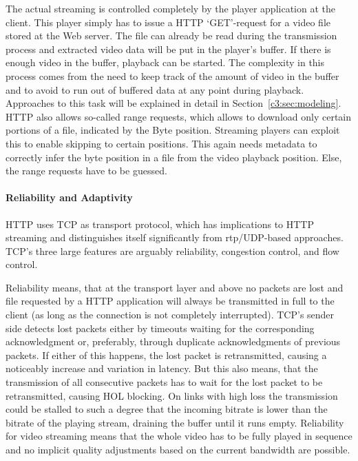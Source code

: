 The actual streaming is controlled completely by the player application at the client. This player simply has to issue a \gls{HTTP} `GET'-request for a video file stored at the Web server. The file can already be read during the transmission process and extracted video data will be put in the player's buffer. If there is enough video in the buffer, playback can be started. The complexity in this process comes from the need to keep track of the amount of video in the buffer and to avoid to run out of buffered data at any point during playback. Approaches to this task will be explained in detail in Section~\ref{c3:sec:modeling}. \gls{HTTP} also allows so-called range requests, which allows to download only certain portions of a file, indicated by the Byte position. Streaming players can exploit this to enable skipping to certain positions. This again needs metadata to correctly infer the byte position in a file from the video playback position. Else, the range requests have to be guessed. 


\paragraph{Reliability and Adaptivity}

\gls{HTTP} uses \gls{TCP} as transport protocol, which has implications to \gls{HTTP} streaming and distinguishes itself significantly from \gls{rtp}/\gls{UDP}-based approaches. \gls{TCP}'s three large features are arguably reliability, congestion control, and flow control.

Reliability means, that at the transport layer and above no packets are lost and file requested by a \gls{HTTP} application will always be transmitted in full to the client (as long as the connection is not completely interrupted). \gls{TCP}'s sender side detects lost packets either by timeouts waiting for the corresponding acknowledgment or, preferably, through duplicate acknowledgments of previous packets. If either of this happens, the lost packet is retransmitted, causing a noticeably increase and variation in latency. But this also means, that the transmission of all consecutive packets has to wait for the lost packet to be retransmitted, causing \gls{HOL} blocking. On links with high loss the transmission could be stalled to such a degree that the incoming bitrate is lower than the bitrate of the playing stream, draining the buffer until it runs empty. Reliability for video streaming means that the whole video has to be fully played in sequence and no implicit quality adjustments based on the current bandwidth are possible.

